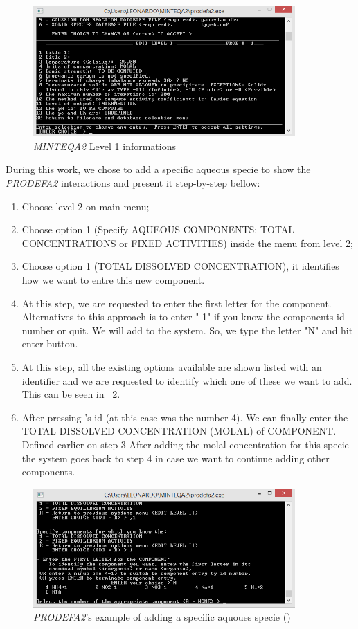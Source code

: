 \begin{figure}[ht!]
\centering
\includegraphics[width=100mm]{figures/minteq-level1.png}
\caption{\emph{MINTEQA2} Level 1 informations}
\label{minteq:level1}
\end{figure}


During this work, we chose to add a specific aqueous specie to show the \emph{PRODEFA2} interactions and present it step-by-step bellow:

\begin{enumerate}
\item Choose level 2 on main menu;
\item Choose option 1 (Specify AQUEOUS COMPONENTS: TOTAL CONCENTRATIONS or FIXED ACTIVITIES) inside the menu from level 2;
\item Choose option 1 (TOTAL DISSOLVED CONCENTRATION), it identifies how we want to entre this new component.
\item At this step, we are requested to enter the first letter for the component. Alternatives to this approach is to enter "-1" if you know the components id number or quit. We will add  to the system. So, we type the letter "N" and hit enter button.
\item At this step, all the existing options available are shown listed with an identifier and we are requested to identify which one of these we want to add. This can be seen in ~\ref{minteq:Na+}.
\item After pressing 's id (at this case was the number 4). We can finally enter the TOTAL DISSOLVED CONCENTRATION (MOLAL) of COMPONENT. Defined earlier on step 3 After adding the molal concentration for this specie the system goes back to step 4 in case we want to continue adding other components.
\end{enumerate}

\begin{figure}[ht!]
\centering
\includegraphics[width=100mm]{figures/minteq-Na+.png}
\caption{\emph{PRODEFA2}'s example of adding a specific aquoues specie () }
\label{minteq:Na+}
\end{figure}

